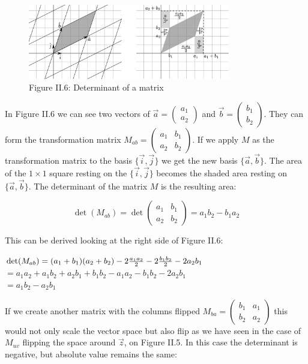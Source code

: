 \begin{figure}[htbp]
    \begin{center}
        \includegraphics[width=250pt]{../img/ii-determinant.png}
        \caption{Figure II.6: Determinant of a matrix}
    \end{center}
\end{figure}


In Figure II.6 we can see two vectors of \(\vec a = \begin{pmatrix} a_1 \\ a_2 \end{pmatrix}\) and \(\vec b = \begin{pmatrix} b_1 \\ b_2 \end{pmatrix}\). They can form the transformation matrix \(M_{ab} =  \begin{pmatrix}
  a_{1} & b_{1} \\
  a_{2} & b_{2}
 \end{pmatrix}\). If we apply \(M\) as the transformation matrix to the basis \(\{\vec i, \vec j\}\) we get the new basis \(\{\vec a, \vec b\}\). The area of the \(1 \times 1\) square resting on the \(\{\vec i, \vec j\}\) becomes the shaded area resting on \(\{\vec a, \vec b\}\). The determinant of the matrix \(M\) is the resulting area:

 \[\det(M_{ab}) = \det\begin{pmatrix}
  a_{1} & b_{1} \\
  a_{2} & b_{2}
 \end{pmatrix} = a_1b_2 - b_1a_2\]

This can be derived looking at the right side of Figure II.6:

\(\det(M_{ab}) = (a_1 + b_1)(a_2 + b_2) - 2 {a_1a_2 \over 2}  - 2 {b_1b_2 \over 2} - 2 a_2 b_1\) \\
\(= a_1a_2 + a_1b_2 + a_2b_1 + b_1b_2 - a_1a_2 - b_1b_2 - 2 a_2 b_1\) \\
\(= a_1b_2 - a_2b_1\)

If we create another matrix with the columns flipped \(M_{ba} = \begin{pmatrix}
  b_{1} & a_{1} \\
  b_{2} & a_{2}
 \end{pmatrix}\) this would not only scale the vector space but also flip as we have seen in the case of \(M_{uv}\) flipping the space around \(\vec z\), on Figure II.5. In this case the determinant is negative, but absolute value remains the same:

